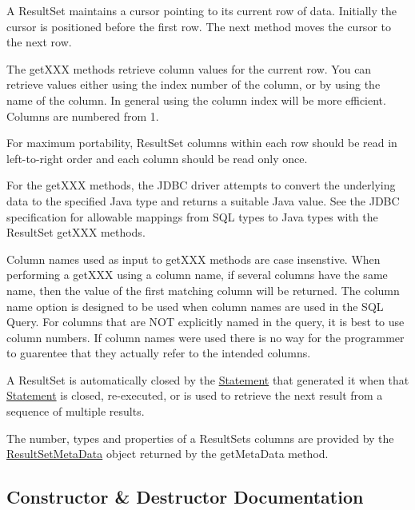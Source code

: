A Result\+Set maintains a cursor pointing to its current row of data. Initially the cursor is positioned before the first row. The \textquotesingle{}next\textquotesingle{} method moves the cursor to the next row. 

The get\+X\+XX methods retrieve column values for the current row. You can retrieve values either using the index number of the column, or by using the name of the column. In general using the column index will be more efficient. Columns are numbered from 1. 

For maximum portability, Result\+Set columns within each row should be read in left-\/to-\/right order and each column should be read only once. 

For the get\+X\+XX methods, the J\+D\+BC driver attempts to convert the underlying data to the specified Java type and returns a suitable Java value. See the J\+D\+BC specification for allowable mappings from S\+QL types to Java types with the Result\+Set get\+X\+XX methods. 

Column names used as input to get\+X\+XX methods are case insenstive. When performing a get\+X\+XX using a column name, if several columns have the same name, then the value of the first matching column will be returned. The column name option is designed to be used when column names are used in the S\+QL Query. For columns that are N\+OT explicitly named in the query, it is best to use column numbers. If column names were used there is no way for the programmer to guarentee that they actually refer to the intended columns. 

A Result\+Set is automatically closed by the \mbox{\hyperlink{interfacecom_1_1mysql_1_1jdbc_1_1_statement}{Statement}} that generated it when that \mbox{\hyperlink{interfacecom_1_1mysql_1_1jdbc_1_1_statement}{Statement}} is closed, re-\/executed, or is used to retrieve the next result from a sequence of multiple results. 

The number, types and properties of a Result\+Set\textquotesingle{}s columns are provided by the \mbox{\hyperlink{classcom_1_1mysql_1_1jdbc_1_1_result_set_meta_data}{Result\+Set\+Meta\+Data}} object returned by the get\+Meta\+Data method. 

\subsection{Constructor \& Destructor Documentation}
\mbox{\label{classcom_1_1mysql_1_1jdbc_1_1_result_set_impl_a213c844e09d851346717edbe91683621}} 

